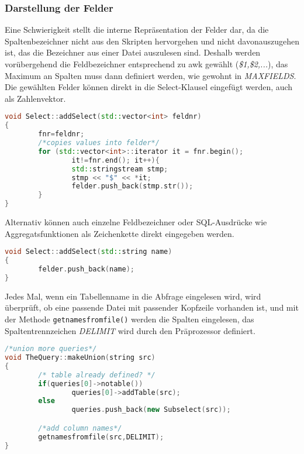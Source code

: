 \subsubsection{Darstellung der Felder}
Eine Schwierigkeit stellt die interne Repräsentation der Felder dar, da die Spaltenbezeichner nicht aus den Skripten hervorgehen und nicht davonauszugehen ist, das die Bezeichner aus einer Datei auszulesen sind. Deshalb werden vorübergehend die Feldbezeichner entsprechend zu awk gewählt (\textit{\$1,\$2,...}), das Maximum an Spalten muss dann definiert werden, wie gewohnt in \textit{MAXFIELDS}. Die gewählten Felder können direkt in die Select-Klausel eingefügt werden, auch als Zahlenvektor.

\begin{lstlisting}[language=C++]
void Select::addSelect(std::vector<int> feldnr)
{
        fnr=feldnr;
        /*copies values into felder*/
        for (std::vector<int>::iterator it = fnr.begin();
                it!=fnr.end(); it++){
                std::stringstream stmp;
                stmp << "$" << *it;
                felder.push_back(stmp.str());
        }
}
\end{lstlisting}

Alternativ können auch einzelne Feldbezeichner oder SQL-Ausdrücke wie Aggregatsfunktionen als Zeichenkette direkt eingegeben werden.
\begin{lstlisting}[language=C++]
void Select::addSelect(std::string name)
{
        felder.push_back(name);
}
\end{lstlisting}

Jedes Mal, wenn ein Tabellenname in die Abfrage eingelesen wird, wird überprüft, ob eine passende Datei mit passender Kopfzeile vorhanden ist, und mit der Methode \lstinline{getnamesfromfile()} werden die Spalten eingelesen, das Spaltentrennzeichen \textit{DELIMIT} wird durch den Präprozessor definiert.

\begin{lstlisting}[language=C++]
/*union more queries*/
void TheQuery::makeUnion(string src)
{
        /* table already defined? */
        if(queries[0]->notable())
                queries[0]->addTable(src);
        else
                queries.push_back(new Subselect(src));

        /*add column names*/
        getnamesfromfile(src,DELIMIT);
}
\end{lstlisting}

